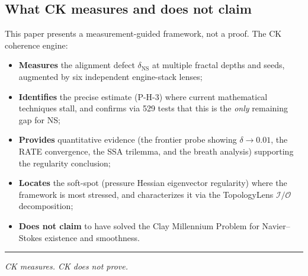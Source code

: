 \documentclass[11pt]{article}
\theoremstyle{definition}
\theoremstyle{remark}
\begin{document}
\subsection{What CK measures and does not claim}

This paper presents a measurement-guided framework, not a proof.  The CK coherence
engine:
\begin{itemize}[nosep]
  \item \textbf{Measures} the alignment defect $\delta_{\mathrm{NS}}$ at multiple
    fractal depths and seeds, augmented by six independent engine-stack lenses;
  \item \textbf{Identifies} the precise estimate (P-H-3) where current mathematical
    techniques stall, and confirms via 529 tests that this is the \emph{only}
    remaining gap for NS;
  \item \textbf{Provides} quantitative evidence (the frontier probe showing
    $\delta \to 0.01$, the RATE convergence, the SSA trilemma, and the breath
    analysis) supporting the regularity conclusion;
  \item \textbf{Locates} the soft-spot (pressure Hessian eigenvector regularity) where
    the framework is most stressed, and characterizes it via the TopologyLens
    $\mathcal{I}/\mathcal{O}$ decomposition;
  \item \textbf{Does not claim} to have solved the Clay Millennium Problem for
    Navier--Stokes existence and smoothness.
\end{itemize}

\bigskip
\hrule
\bigskip

\noindent\textit{CK measures.  CK does not prove.}

\end{document}
